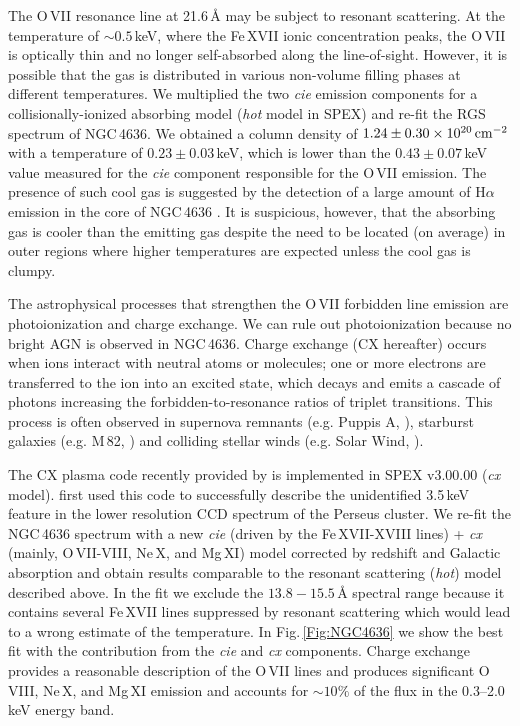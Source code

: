 \documentclass[useAMS,usenatbib]{mn2e}
\begin{document}
{The O\,{\small VII} resonance line at 21.6\,{\AA} may be subject 
to resonant scattering. At the temperature of $\sim0.5$\,keV, 
where the Fe\,{\small XVII} ionic concentration peaks, the O\,{\small VII} 
is optically thin and no longer self-absorbed along the line-of-sight.
However, it is possible that the gas is distributed in various
non-volume filling phases at different temperatures.
We multiplied the two \textit{cie} emission components for a collisionally-ionized absorbing model
(\textit{hot} model in SPEX) and re-fit the RGS spectrum of NGC\,4636.
We obtained a column density of $1.24\pm0.30\times10^{20}\,{\rm cm}^{-2}$ 
with a temperature of $0.23\pm0.03$\,keV, which is lower than the 
$0.43\pm0.07$\,keV value measured for the \textit{cie} component responsible
for the O\,{\small VII} emission.
The presence of such cool gas is suggested by the detection of a large amount 
of H$\alpha$ emission in the core of NGC\,4636 \citep{Werner2014}.
It is suspicious, however, that the absorbing gas is cooler than the emitting gas 
despite the need to be located (on average) in outer regions where
higher temperatures are expected unless the cool gas is clumpy.

The astrophysical processes that strengthen the 
O\,{\small VII} forbidden line emission
are photoionization and charge exchange. We can rule out photoionization
because no bright AGN is observed in NGC\,4636. 
Charge exchange (CX hereafter) occurs when ions interact 
with neutral atoms or molecules; 
one or more electrons are transferred to the ion into an excited state,
which decays and emits a cascade of photons 
increasing the forbidden-to-resonance ratios of triplet transitions.
This process is often observed in supernova remnants 
(e.g. Puppis A, \citealt{Katsuda2012}), 
starburst galaxies (e.g. M\,82, \citealt{Liu2011}) 
and colliding stellar winds (e.g. Solar Wind, \citealt{Snowden2004}).

The CX plasma code recently provided by \citet{Gu2016} 
is implemented in SPEX v3.00.00 (\textit{cx} model). \citet{Gu2015} first used this code 
to successfully describe the unidentified 3.5\,keV feature 
in the lower resolution CCD spectrum of the Perseus cluster.
We re-fit the NGC\,4636 spectrum 
with a new \textit{cie} (driven by the Fe\,{\small XVII-XVIII} lines) 
+ \textit{cx} (mainly, O\,{\small VII-VIII}, Ne\,{\small X}, and Mg\,{\small XI})
model corrected by redshift and Galactic absorption and obtain results 
comparable to the resonant scattering (\textit{hot}) model described above.
In the fit we exclude the $13.8-15.5$\,{\AA} spectral range because it contains
several Fe\,{\small XVII} lines suppressed by resonant scattering
which would lead to a wrong estimate of the temperature.
In Fig.\,\ref{Fig:NGC4636} we show the best fit with the contribution 
from the \textit{cie} and \textit{cx} components. Charge exchange provides a reasonable
description of the O\,{\small VII} lines and produces significant
O\,{\small VIII}, Ne\,{\small X}, and Mg\,{\small XI} emission and
accounts for $\sim10\%$ of the flux in the 0.3--2.0\,keV energy band.

}
\end{document}
